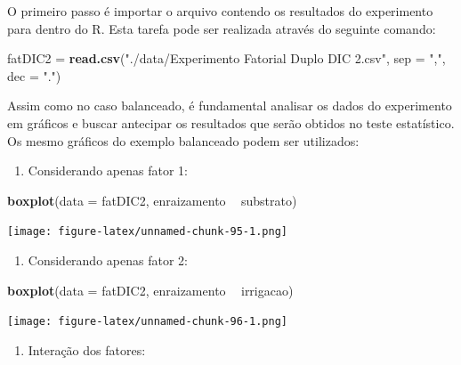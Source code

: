 \documentclass[
]{article}
\newenvironment{Shaded}{\begin{snugshade}}{\end{snugshade}}
\newcommand{\DataTypeTok}[1]{\textcolor[rgb]{0.13,0.29,0.53}{#1}}
\newcommand{\KeywordTok}[1]{\textcolor[rgb]{0.13,0.29,0.53}{\textbf{#1}}}
\newcommand{\NormalTok}[1]{#1}
\newcommand{\OperatorTok}[1]{\textcolor[rgb]{0.81,0.36,0.00}{\textbf{#1}}}
\newcommand{\StringTok}[1]{\textcolor[rgb]{0.31,0.60,0.02}{#1}}
\providecommand{\tightlist}{%
  \setlength{\itemsep}{0pt}\setlength{\parskip}{0pt}}
\begin{document}
O primeiro passo é importar o arquivo contendo os resultados do experimento para dentro do R. Esta tarefa pode ser realizada através do seguinte comando:

\begin{Shaded}
\begin{Highlighting}[]
\NormalTok{fatDIC2 =}\StringTok{ }\KeywordTok{read.csv}\NormalTok{(}\StringTok{"./data/Experimento Fatorial Duplo DIC 2.csv"}\NormalTok{, }
                   \DataTypeTok{sep =} \StringTok{","}\NormalTok{, }\DataTypeTok{dec =} \StringTok{"."}\NormalTok{)}
\end{Highlighting}
\end{Shaded}

Assim como no caso balanceado, é fundamental analisar os dados do experimento em gráficos e buscar antecipar os resultados que serão obtidos no teste estatístico. Os mesmo gráficos do exemplo balanceado podem ser utilizados:

\begin{enumerate}
\def\labelenumi{\arabic{enumi}.}
\tightlist
\item
  Considerando apenas fator 1:
\end{enumerate}

\begin{Shaded}
\begin{Highlighting}[]
\KeywordTok{boxplot}\NormalTok{(}\DataTypeTok{data =}\NormalTok{ fatDIC2, enraizamento }\OperatorTok{~}\StringTok{ }\NormalTok{substrato)}
\end{Highlighting}
\end{Shaded}

\texttt{[image: figure-latex/unnamed-chunk-95-1.png]}

\begin{enumerate}
\def\labelenumi{\arabic{enumi}.}
\setcounter{enumi}{1}
\tightlist
\item
  Considerando apenas fator 2:
\end{enumerate}

\begin{Shaded}
\begin{Highlighting}[]
\KeywordTok{boxplot}\NormalTok{(}\DataTypeTok{data =}\NormalTok{ fatDIC2, enraizamento }\OperatorTok{~}\StringTok{ }\NormalTok{irrigacao)}
\end{Highlighting}
\end{Shaded}

\texttt{[image: figure-latex/unnamed-chunk-96-1.png]}

\begin{enumerate}
\def\labelenumi{\arabic{enumi}.}
\setcounter{enumi}{2}
\tightlist
\item
  Interação dos fatores:
\end{enumerate}
\end{document}

